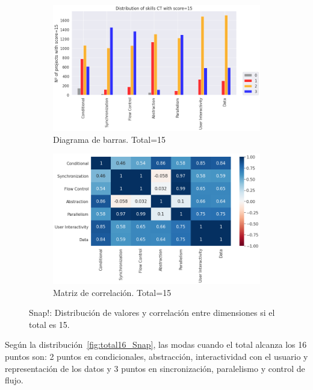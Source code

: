 \documentclass[a4paper, 12pt]{book}
\begin{document}
\begin{figure}[H]
    \centering
    \begin{subfigure}[h]{.49\textwidth} 
        \includegraphics[width=\textwidth]{img/distribucion_15_Snap}
        \caption{Diagrama de barras. Total=15}
        \label{fig:total15_Snap}
    \end{subfigure}       
    \begin{subfigure}[h]{.49\textwidth} 
        \includegraphics[width=\textwidth]{img/corr_15_Snap}
        \caption{Matriz de correlación. Total=15}
        \label{fig:corr15_Snap}
    \end{subfigure}
    \caption{Snap!: Distribución de valores y correlación entre dimensiones si el total es 15.}
\end{figure}

Según la distribución~\ref{fig:total16_Snap}, las modas cuando el total alcanza los 16 puntos son: 2 puntos en condicionales, abstracción, interactividad con el usuario y representación de los datos y 3 puntos en sincronización, paralelismo y control de flujo.
\end{document}
